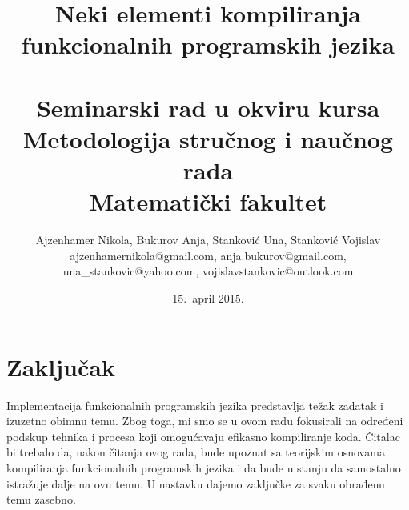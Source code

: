 \documentclass[a4paper]{article}
\begin{document}
\title{Neki elementi kompiliranja funkcionalnih programskih jezika\\ \small{~\\Seminarski rad u okviru kursa\\Metodologija stručnog i naučnog rada\\ Matematički fakultet}}

\author{
	Ajzenhamer Nikola, Bukurov Anja, Stanković Una, Stanković Vojislav\\
	ajzenhamernikola@gmail.com, anja.bukurov@gmail.com,\\
	una\_stankovic@yahoo.com, vojislavstankovic@outlook.com
	}
\date{15.~april 2015.}
\maketitle


\tableofcontents

\newpage









\section{Zaključak}
\label{sec:zakljucak}

Implementacija funkcionalnih programskih jezika predstavlja težak zadatak i izuzetno obimnu temu. Zbog toga, mi smo se u ovom radu fokusirali na određeni podskup tehnika i procesa koji omogućavaju efikasno kompiliranje koda. Čitalac bi trebalo da, nakon čitanja ovog rada, bude upoznat sa teorijskim osnovama kompiliranja funkcionalnih programskih jezika i da bude u stanju da samostalno istražuje dalje na ovu temu. U nastavku dajemo zaključke za svaku obrađenu temu zasebno.
\end{document}
